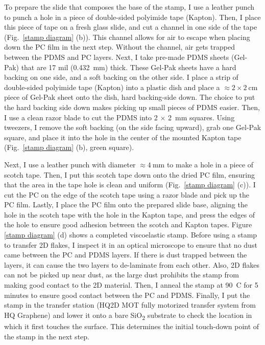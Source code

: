 \documentclass[double,12pt,1in,seploa]{beavtex}
\begin{document}
To prepare the slide that composes the base of the stamp, I use a leather punch to punch a hole in a piece of double-sided polyimide tape (Kapton). Then, I place this piece of tape on a fresh glass slide, and cut a channel in one side of the tape (Fig.\ \ref{stamp diagram} (b)). This channel allows for air to escape when placing down the PC film in the next step. Without the channel, air gets trapped between the PDMS and PC layers. Next, I take pre-made PDMS sheets (Gel-Pak) that are 17 mil (\SI{0.432}{\milli\meter}) thick. These Gel-Pak sheets have a hard backing on one side, and a soft backing on the other side. I place a strip of double-sided polyimide tape (Kapton) into a plastic dish and place a $\approx 2 \times \SI{2}{\centi\meter}$ piece of Gel-Pak sheet onto the dish, hard backing-side down. The choice to put the hard backing side down makes picking up small pieces of PDMS easier. Then, I use a clean razor blade to cut the PDMS into 2 $\times$ \SI{2}{mm} squares. Using tweezers, I remove the soft backing (on the side facing upward), grab one Gel-Pak square, and place it into the hole in the center of the mounted Kapton tape (Fig.\ \ref{stamp diagram} (b), green square).

Next, I use a leather punch with diameter $\approx  \SI{4}{\milli\meter}$ to make a hole in a piece of scotch tape. Then, I put this scotch tape down onto the dried PC film, ensuring that the area in the tape hole is clean and uniform (Fig.\ \ref{stamp diagram} (c)). I cut the PC on the edge of the scotch tape using a razor blade and pick up the PC film. Lastly, I place the PC film onto the prepared slide base, aligning the hole in the scotch tape with the hole in the Kapton tape, and press the edges of the hole to ensure good adhesion between the scotch and Kapton tapes. Figure \ref{stamp diagram} (d) shows a completed viscoelastic stamp. Before using a stamp to transfer 2D flakes, I inspect it in an optical microscope to ensure that no dust came between the PC and PDMS layers. If there is dust trapped between the layers, it can cause the two layers to de-laminate from each other. Also, 2D flakes can not be picked up near dust, as the large dust prohibits the stamp from making good contact to the 2D material. Then, I anneal the stamp at \SI{90}{C} for 5 minutes to ensure good contact between the PC and PDMS. Finally, I put the stamp in the transfer station (HQ2D MOT fully motorized transfer system from HQ Graphene) and lower it onto a bare SiO\textsubscript{2} substrate to check the location in which it first touches the surface. This determines the initial touch-down point of the stamp in the next step.
\end{document}
